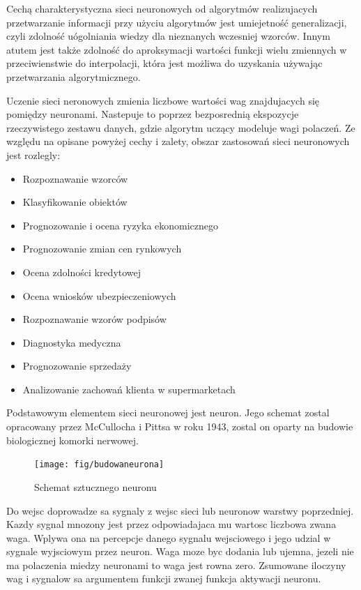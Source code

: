 \documentclass[brudnopis]{xmgr}
\begin{document}
Cechą charakterystyczna sieci neuronowych od algorytmów realizujacych przetwarzanie informacji przy użyciu algorytmów jest umiejetność generalizacji, czyli zdolność uógolniania wiedzy dla nieznanych wczesniej wzorców. Innym atutem jest także zdolność do aproksymacji wartości funkcji wielu zmiennych w przeciwienstwie do interpolacji, która jest możliwa do uzyskania używając przetwarzania algorytmicznego.

Uczenie sieci neronowych zmienia liczbowe wartości wag znajdujacych się pomiędzy neuronami. Nastepuje to poprzez bezposrednią ekspozycje rzeczywistego zestawu danych, gdzie algorytm uczący modeluje wagi polaczeń. Ze względu na opisane powyżej cechy i zalety, obszar zastosowań sieci neuronowych jest rozlegly:

\begin{itemize}
\item
Rozpoznawanie wzorców
\item
Klasyfikowanie obiektów
\item
Prognozowanie i ocena ryzyka ekonomicznego
\item
Prognozowanie zmian cen rynkowych
\item
Ocena zdolności kredytowej
\item
Ocena wniosków ubezpieczeniowych
\item
Rozpoznawanie wzorów podpisów
\item
Diagnostyka medyczna
\item
Prognozowanie sprzedaży
\item
Analizowanie zachowań klienta w supermarketach
\end{itemize}

Podstawowym elementem sieci neuronowej jest neuron. Jego schemat zostal opracowany przez McCullocha i Pittsa w roku 1943, zostal on oparty na budowie biologicznej komorki nerwowej.

\begin{figure}[!tbh]
\centering
\texttt{[image: fig/budowaneurona]}
\caption{Schemat sztucznego neuronu}
\end{figure}
\newpage

Do wejsc doprowadze sa sygnaly z wejsc sieci lub neuronow warstwy poprzedniej. Kazdy sygnal mnozony jest przez odpowiadajaca mu wartosc liczbowa zwana waga. Wplywa ona na percepcje danego sygnalu wejsciowego i jego udzial w sygnale wyjsciowym przez neuron. Waga moze byc dodania lub ujemna, jezeli nie ma polaczenia miedzy neuronami to waga jest rowna zero. Zsumowane iloczyny wag i sygnalow sa argumentem funkcji zwanej funkcja aktywacji neuronu.
\end{document}
